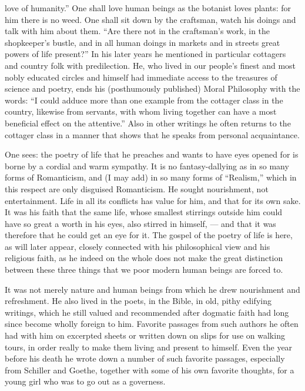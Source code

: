 \documentclass[12pt,a4paper,openany]{book}
\newcommand{\opage}[1]{\marginnote{\footnotesize\textit{[#1]}}}
\begin{document}
love of humanity.'' One shall love human beings as
the botanist loves plants: for him there is no weed.
One shall sit down by the craftsman, watch his doings
and talk with him about them. ``Are there not in the craftsman's
work, in the shopkeeper's bustle, and in all human doings
in markets and in streets great powers of life present?'' In
his later years he mentioned in particular cottagers and
country folk with predilection. He, who lived in our people's
finest and most nobly educated circles and himself had immediate
access to the treasures of science and poetry, ends his (posthumously
published) Moral Philosophy with the words: ``I could
adduce more than one example from the cottager class
in the country, likewise from servants, with whom living together can have
a most beneficial effect on the attentive.'' Also in other writings
he often returns to the cottager class in a manner
that shows that he speaks from personal acquaintance.

One sees: the poetry of life that he preaches and wants to have
eyes opened for is borne by a cordial and warm sympathy.
It is no fantasy-dallying as in so many forms of Romanticism,
and (I may add) in so many forms of ``Realism,'' which
in this respect are only disguised Romanticism. He sought
nourishment, not entertainment. Life in all its conflicts
has value for him, and that for its own sake. It was
his faith that the same life, whose smallest stirrings outside
him could have so great a worth in his eyes, also stirred
in himself, --- and that it was therefore that he could get an eye
for it. The gospel of the poetry of life is here, as will later
appear, closely connected with his philosophical view and
\opage{70}his religious faith, as he indeed on the whole does not make the
great distinction between these three things that we poor modern
human beings are forced to.

It was not merely nature and human beings from which he drew nourishment
and refreshment. He also lived in the poets, in
the Bible, in old, pithy edifying writings, which he
still valued and recommended after dogmatic faith
had long since become wholly foreign to him. Favorite passages from
such authors he often had with him on excerpted sheets
or written down on slips for use on walking tours, in order really to
make them living and present to himself. Even the year
before his death he wrote down a number of such favorite passages,
especially from Schiller and Goethe, together with some of his own
favorite thoughts, for a young girl who was to go out as
a governess.
\end{document}
